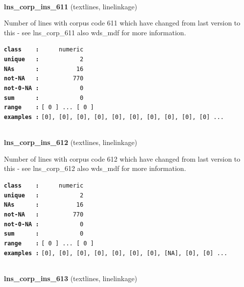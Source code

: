 \documentclass[]{article}
\begin{document}
~

\textbf{lns\_corp\_ins\_611} (textlines, linelinkage)

Number of lines with corpus code 611 which have changed from last
version to this - see lns\_corp\_611 also wds\_mdf for more information.

\textbf{\texttt{class\ \ \ \ :}} \texttt{~~~~~numeric}\\
\textbf{\texttt{unique\ \ \ :}} \texttt{~~~~~~~~~~~2}\\
\textbf{\texttt{NAs\ \ \ \ \ \ :}} \texttt{~~~~~~~~~~16}\\
\textbf{\texttt{not-NA\ \ \ :}} \texttt{~~~~~~~~~770}\\
\textbf{\texttt{not-0-NA\ :}} \texttt{~~~~~~~~~~~0}\\
\textbf{\texttt{sum\ \ \ \ \ \ :}} \texttt{~~~~~~~~~~~0}\\
\textbf{\texttt{range\ \ \ \ :}}
\texttt{{[}\ 0\ {]}\ ...\ {[}\ 0\ {]}}\\
\textbf{\texttt{examples\ :}}
\texttt{{[}0{]},\ {[}0{]},\ {[}0{]},\ {[}0{]},\ {[}0{]},\ {[}0{]},\ {[}0{]},\ {[}0{]},\ {[}0{]},\ {[}0{]}\ ...}\\

~

\textbf{lns\_corp\_ins\_612} (textlines, linelinkage)

Number of lines with corpus code 612 which have changed from last
version to this - see lns\_corp\_612 also wds\_mdf for more information.

\textbf{\texttt{class\ \ \ \ :}} \texttt{~~~~~numeric}\\
\textbf{\texttt{unique\ \ \ :}} \texttt{~~~~~~~~~~~2}\\
\textbf{\texttt{NAs\ \ \ \ \ \ :}} \texttt{~~~~~~~~~~16}\\
\textbf{\texttt{not-NA\ \ \ :}} \texttt{~~~~~~~~~770}\\
\textbf{\texttt{not-0-NA\ :}} \texttt{~~~~~~~~~~~0}\\
\textbf{\texttt{sum\ \ \ \ \ \ :}} \texttt{~~~~~~~~~~~0}\\
\textbf{\texttt{range\ \ \ \ :}}
\texttt{{[}\ 0\ {]}\ ...\ {[}\ 0\ {]}}\\
\textbf{\texttt{examples\ :}}
\texttt{{[}0{]},\ {[}0{]},\ {[}0{]},\ {[}0{]},\ {[}0{]},\ {[}0{]},\ {[}0{]},\ {[}NA{]},\ {[}0{]},\ {[}0{]}\ ...}\\

~

\textbf{lns\_corp\_ins\_613} (textlines, linelinkage)
\end{document}
